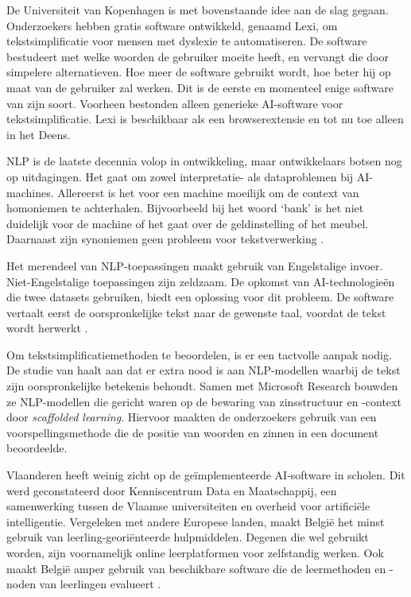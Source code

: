 De Universiteit van Kopenhagen is met bovenstaande idee aan de slag gegaan. Onderzoekers \textcite{Bingel2018} hebben gratis software ontwikkeld, genaamd Lexi, om tekstsimplificatie voor mensen met dyslexie te automatiseren. De software bestudeert met welke woorden de gebruiker moeite heeft, en vervangt die door simpelere alternatieven. Hoe meer de software gebruikt wordt, hoe beter hij op maat van de gebruiker zal werken. Dit is de eerste en momenteel enige software van zijn soort. Voorheen bestonden alleen generieke AI-software voor tekstsimplificatie. Lexi is beschikbaar als een browserextensie en tot nu toe alleen in het Deens. 


NLP is de laatste decennia volop in ontwikkeling, maar ontwikkelaars botsen nog op uitdagingen. Het gaat om zowel interpretatie- als dataproblemen bij AI-machines. Allereerst is het voor een machine moeilijk om de context van homoniemen te achterhalen. Bijvoorbeeld bij het woord ‘bank’ is het niet duidelijk voor de machine of het gaat over de geldinstelling of het meubel. Daarnaast zijn synoniemen geen probleem voor tekstverwerking \autocite{Roldos2020}.

Het merendeel van NLP-toepassingen maakt gebruik van Engelstalige invoer. Niet-Engelstalige toepassingen zijn zeldzaam. De opkomst van AI-technologieën die twee datasets gebruiken, biedt een oplossing voor dit probleem. De software vertaalt eerst de oorspronkelijke tekst naar de gewenste taal, voordat de tekst wordt herwerkt \autocite{Sciforce2020}.

Om tekstsimplificatiemethoden te beoordelen, is er een tactvolle aanpak nodig. De studie van \textcite{Swayamdipta2019} haalt aan dat er extra nood is aan NLP-modellen waarbij de tekst zijn oorspronkelijke betekenis behoudt. Samen met Microsoft Research bouwden ze NLP-modellen die gericht waren op de bewaring van zinsstructuur en -context door \emph{scaffolded learning}. Hiervoor maakten de onderzoekers gebruik van een voorspellingsmethode die de positie van woorden en zinnen in een document beoordeelde.

Vlaanderen heeft weinig zicht op de geïmplementeerde AI-software in scholen. Dit werd geconstateerd door Kenniscentrum Data en Maatschappij, een samenwerking tussen de Vlaamse universiteiten en overheid voor artificiële intelligentie. Vergeleken met andere Europese landen, maakt België het minst gebruik van leerling-georiënteerde hulpmiddelen. Degenen die wel gebruikt worden, zijn voornamelijk online leerplatformen voor zelfstandig werken. Ook maakt België amper gebruik van beschikbare software die de leermethoden en -noden van leerlingen evalueert \autocite{Martens2021a}. 



